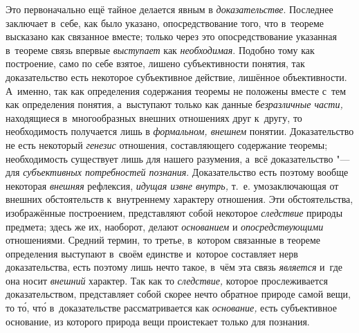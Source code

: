 Это первоначально ещё тайное делается явным в
{\em доказательстве}.
Последнее заключает в~себе, как было указано,
опосредствование того, что в~теореме высказано как связанное вместе; только
через это опосредствование указанная в~теореме связь впервые
{\em выступает} как
{\em необходимая}.
Подобно тому как построение, само по себе взятое, лишено
субъективности понятия, так доказательство есть некоторое субъективное
действие, лишённое объективности. А~именно, так как определения содержания
теоремы не положены вместе с~тем как определения понятия, а~выступают
только как данные {\em безразличные
части,} находящиеся в~многообразных внешних отношениях друг
к~другу, то необходимость получается лишь в
{\em формальном, внешнем}
понятии. Доказательство не есть некоторый
{\em генезис} отношения,
составляющего содержание теоремы; необходимость существует лишь для нашего
разумения, а~всё доказательство "--- для
{\em субъективных потребностей
познания}. Доказательство есть поэтому вообще некоторая
{\em внешняя} рефлексия,
{\em идущая извне внутрь,}
т.~е. умозаключающая от внешних обстоятельств к~внутреннему
характеру отношения. Эти обстоятельства, изображённые построением,
представляют собой некоторое
{\em следствие} природы
предмета; здесь же их, наоборот, делают
{\em основанием} и
{\em опосредствующими}
отношениями. Средний термин, то третье, в~котором связанные в
теореме определения выступают в~своём единстве и~которое составляет нерв
доказательства, есть поэтому лишь нечто такое, в~чём эта связь
{\em является} и~где она
носит {\em внешний}
характер. Так как то
{\em следствие,} которое
прослеживается доказательством, представляет собой скорее нечто обратное
природе самой вещи, то т\'{о}, чт\'{о} в~доказательстве рассматривается как
{\em основание,} есть
субъективное основание, из которого природа вещи проистекает только для
познания.

